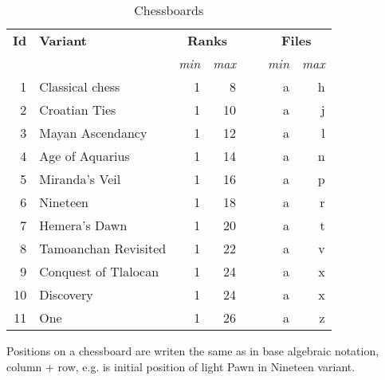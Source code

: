 \begin{table}[!h]
\centering
\begin{tabular}{ rlrrcrr }
\toprule
\textbf{Id} & \textbf{Variant}      & \multicolumn{2}{c}{ \textbf{Ranks} } & ~ & \multicolumn{2}{c}{ \textbf{Files} }   \\ \cmidrule{3-4} \cmidrule{6-7}
            &                       & \emph{min} & \emph{max}              &   & \emph{min} & \emph{max}                \\
\midrule
          1 & Classical chess       & 1          &  8                      &   & a          & h                         \\ %
          2 & Croatian Ties         & 1          & 10                      &   & a          & j                         \\
          3 & Mayan Ascendancy      & 1          & 12                      &   & a          & l                         \\
          4 & Age of Aquarius       & 1          & 14                      &   & a          & n                         \\
          5 & Miranda's Veil        & 1          & 16                      &   & a          & p                         \\
          6 & Nineteen              & 1          & 18                      &   & a          & r                         \\
          7 & Hemera's Dawn         & 1          & 20                      &   & a          & t                         \\
          8 & Tamoanchan Revisited  & 1          & 22                      &   & a          & v                         \\
          9 & Conquest of Tlalocan  & 1          & 24                      &   & a          & x                         \\
         10 & Discovery             & 1          & 24                      &   & a          & x                         \\
         11 & One                   & 1          & 26                      &   & a          & z                         \\
\bottomrule
\end{tabular}
\caption{Chessboards}
\label{tbl:Appendix/Chessboards}
\end{table}

Positions on a chessboard are writen the same as in base algebraic notation, column + row,
e.g.  is initial position of light Pawn in Nineteen variant.

